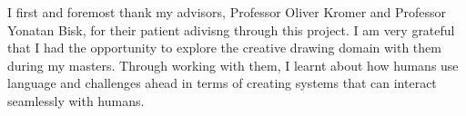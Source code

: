 I first and foremost thank my advisors, Professor Oliver Kromer and Professor Yonatan Bisk, for their patient adivisng through this project. I am very grateful that I had the opportunity to explore the creative drawing domain with them during my masters. Through working with them, I learnt about how humans use language and challenges ahead in terms of creating systems that can interact seamlessly with humans.  